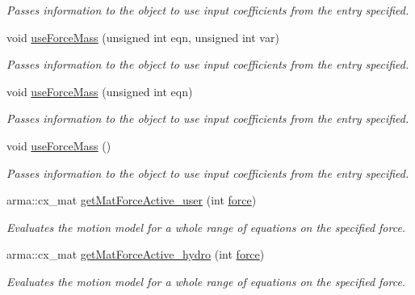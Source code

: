 \begin{DoxyCompactItemize}
\begin{DoxyCompactList}\small\item\em Passes information to the object to use input coefficients from the entry specified. \end{DoxyCompactList}\item 
void \hyperlink{classosea_1_1ofreq_1_1_motion_model_aecaf9f0261355cff2acf602acd728644}{use\-Force\-Mass} (unsigned int eqn, unsigned int var)
\begin{DoxyCompactList}\small\item\em Passes information to the object to use input coefficients from the entry specified. \end{DoxyCompactList}\item 
void \hyperlink{classosea_1_1ofreq_1_1_motion_model_a5c3368c9b82042765c2b542cfa78c200}{use\-Force\-Mass} (unsigned int eqn)
\begin{DoxyCompactList}\small\item\em Passes information to the object to use input coefficients from the entry specified. \end{DoxyCompactList}\item 
void \hyperlink{classosea_1_1ofreq_1_1_motion_model_a1478e13916cc181bbedca771b6c83695}{use\-Force\-Mass} ()
\begin{DoxyCompactList}\small\item\em Passes information to the object to use input coefficients from the entry specified. \end{DoxyCompactList}\item 
arma\-::cx\-\_\-mat \hyperlink{classosea_1_1ofreq_1_1_motion_model_af9d30b6afa16093429fab496d18c5d00}{get\-Mat\-Force\-Active\-\_\-user} (int \hyperlink{input__syntax_8dox_ab0a92c70357da47fe86696522eab7dc8}{force})
\begin{DoxyCompactList}\small\item\em Evaluates the motion model for a whole range of equations on the specified force. \end{DoxyCompactList}\item 
arma\-::cx\-\_\-mat \hyperlink{classosea_1_1ofreq_1_1_motion_model_a56059a3d7f37c9dad5f906714ba159de}{get\-Mat\-Force\-Active\-\_\-hydro} (int \hyperlink{input__syntax_8dox_ab0a92c70357da47fe86696522eab7dc8}{force})
\begin{DoxyCompactList}\small\item\em Evaluates the motion model for a whole range of equations on the specified force. \end{DoxyCompactList}\item 

\end{DoxyCompactItemize}

